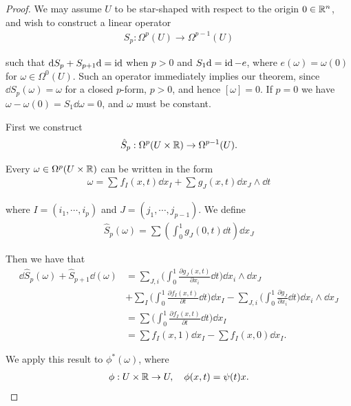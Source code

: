 \begin{proof}
  We may assume $U$ to be star-shaped with respect to the origin $0\in\mathbb{R}^n$,
and wish to construct a linear operator
\begin{align*}
  S_p: \Omega^p(U) \to \Omega^{p-1}(U)
\end{align*}

such that $\mathrm{d} S_p + S_{p+1}\mathrm{d} = \operatorname{id}$ when $p > 0$ and $S_1\mathrm{d} = \operatorname{id} - e$, where $e(\omega) = \omega(0)$
for $\omega\in\Omega^0(U)$. Such an operator immediately implies our theorem, since
$\dd S_p(\omega) = \omega$ for a closed $p$-form, $p > 0$, and hence $[\omega] = 0$. If $p = 0$ we
have $\omega - \omega(0) = S_1\dd\omega = 0$, and $\omega$ must be constant.

First we construct
\begin{align*}
  \hat{S}_p:\Omega^p(U\times\mathbb{R})\to\Omega^{p-1}(U).
\end{align*}

Every $\omega\in\Omega^p(U\times\mathbb{R})$ can be written in the form
\begin{align*}
  \omega = \sum_{}^{}{f_I(x, t)\dd x_I} + \sum_{}^{}{g_J(x, t)\dd x_J\wedge\dd t}
\end{align*}

where $I= (i_1, \cdots, i_p)$ and $J = (j_1, \cdots, j_{p-1})$. We define
\begin{align*}
  \hat{S}_p(\omega) = \sum\left(\int_{0}^{1}g_J(0, t)\dd t\right)\dd x_J
\end{align*}

Then we have that 
\begin{align*}
    \dd\hat{S}_{p}(\omega)+\hat{S}_{p+1}\dd(\omega)
    & = \sum_{J,i}\biggl(\int_{0}^{1}\frac{\partial g_{J}(x,t)}{\partial x_{i}}\dd t\biggr)\dd x_{i}\wedge\dd x_{J} \\
    & + \sum_{I}\biggl(\int_{0}^{1}\frac{\partial f_{I}(x,t)}{\partial t}\dd t\biggr)\dd x_{I}
        - \sum_{J,i}\biggl(\int_{0}^{1}\frac{\partial g_{J}}{\partial x_{i}}\dd t\biggr)\dd x_{i}\wedge\dd x_{J} \\
    & = \sum\biggl(\int_{0}^{1}\frac{\partial f_{I}(x,t)}{\partial t}\dd t\biggr)\dd x_{I} \\
    & = \sum f_{I}(x,1)\dd x_{I}-\sum f_{I}(x,0)\dd x_{I}.
\end{align*}

We apply this result to $\phi^*(\omega)$, where 
\begin{align*}
  \phi:U \times \mathbb{R}\to U, \quad \phi(x, t) = \psi(t)x.
\end{align*}


\end{proof}

